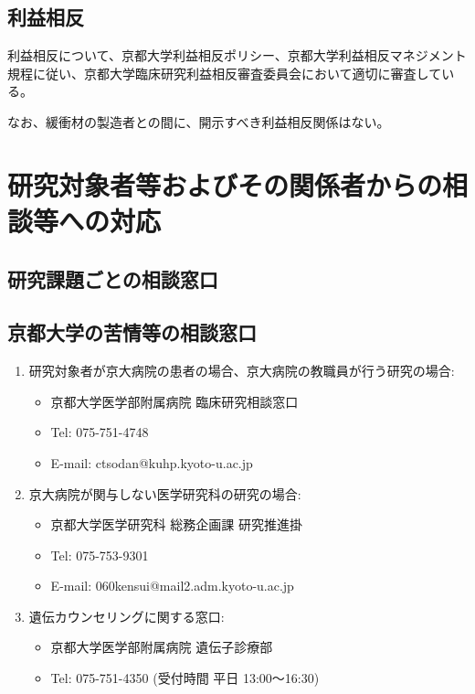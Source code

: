 \documentclass{kyodai-protocol}
\begin{document}
\subsection{利益相反}

利益相反について、京都大学利益相反ポリシー、京都大学利益相反マネジメント規程に従い、京都大学臨床研究利益相反審査委員会において適切に審査している。

なお、緩衝材の製造者との間に、開示すべき利益相反関係はない。

\section{研究対象者等およびその関係者からの相談等への対応}
\label{sec:consultation}

\subsection{研究課題ごとの相談窓口}


\subsection{京都大学の苦情等の相談窓口}

\begin{enumerate}
\item 研究対象者が京大病院の患者の場合、京大病院の教職員が行う研究の場合:
  \begin{itemize}
  \item 京都大学医学部附属病院 臨床研究相談窓口
  \item Tel: 075-751-4748
  \item E-mail: ctsodan@kuhp.kyoto-u.ac.jp
  \end{itemize}

\item 京大病院が関与しない医学研究科の研究の場合:
  \begin{itemize}
  \item 京都大学医学研究科 総務企画課 研究推進掛
  \item Tel: 075-753-9301
  \item E-mail: 060kensui@mail2.adm.kyoto-u.ac.jp
  \end{itemize}

\item 遺伝カウンセリングに関する窓口:
  \begin{itemize}
  \item 京都大学医学部附属病院 遺伝子診療部
  \item Tel: 075-751-4350 (受付時間 平日 13:00〜16:30)
  \end{itemize}
\end{enumerate}
\end{document}
